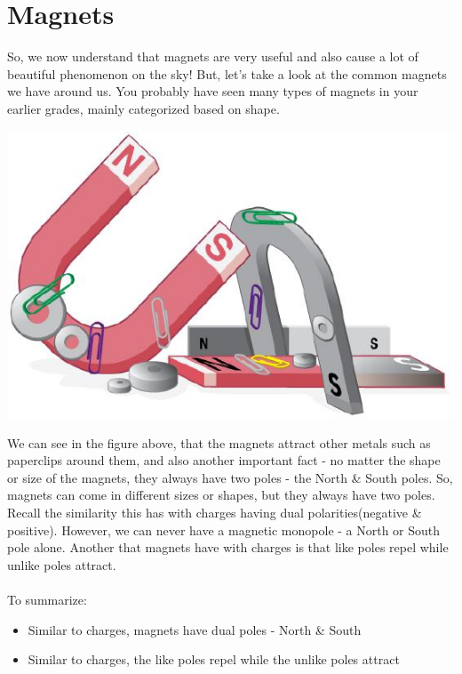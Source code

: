 \documentclass[9pt]{exam}
\begin{document}
	\section*{Magnets}
	So, we now understand that magnets are very useful and also cause a lot of beautiful phenomenon on the sky! But, let's take a look at the common magnets we have around us. You probably have seen many types of magnets in your earlier grades, mainly categorized based on shape.
	\begin{center}
		\includegraphics[scale=0.5]{magnets}
	\end{center}
	We can see in the figure above, that the magnets attract other metals such as paperclips around them, and also another important fact - no matter the shape or size of the magnets, they always have two poles - the North \& South poles. So, magnets can come in different sizes or shapes, but they always have two poles. Recall the similarity this has with charges having dual polarities(negative \& positive). However, we can never have a magnetic monopole - a North or South pole alone. Another that magnets have with charges is that like poles repel while unlike poles attract. \\ \\ To summarize:
	\begin{itemize}
		\item Similar to charges, magnets have dual poles - North \& South
		\item Similar to charges, the like poles repel while the unlike poles attract
	\end{itemize}
\end{document}
